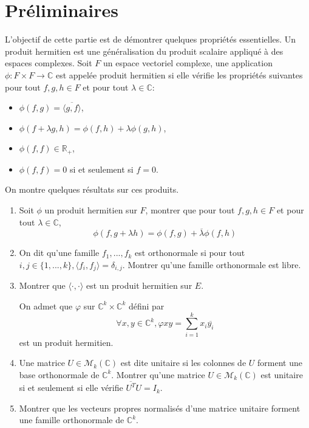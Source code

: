 \documentclass{article}[a4paper]
\newcommand{\R}{\mathbb{R}}
\newcommand{\C}{\mathbb{C}}
\newcommand{\braket}[2]{\langle #1,#2\rangle}
\begin{document}
\section{Préliminaires}
L'objectif de cette partie est de démontrer quelques propriétés essentielles.
Un produit hermitien est une généralisation du produit scalaire appliqué à des espaces 
complexes. Soit \(F\) un espace vectoriel complexe, une application 
\(\phi : F\times F \to \C\) est appelée produit hermitien si elle vérifie les propriétés suivantes 
pour tout \(f,g,h\in F\) et pour tout \(\lambda\in \C\):
\begin{itemize}
    \item \(\phi(f,g) = \overline{\braket{g}{f}}\),
    \item \(\phi(f+\lambda g,h) = \phi(f,h)+\lambda\phi(g,h)\),
    \item \(\phi(f,f) \in \R_+\),
    \item \(\phi(f,f) = 0\) si et seulement si \(f = 0\).
\end{itemize}
On montre quelques résultats sur ces produits.
\begin{enumerate}
    \item Soit \(\phi\) un produit hermitien sur \(F\), montrer que pour tout \(f,g,h\in F\) et pour tout \(\lambda\in \C\),
    \begin{equation*}
        \phi(f,g+ \lambda h) = \phi(f,g) + \overline{\lambda}\phi(f,h)
    \end{equation*}
    \item On dit qu'une famille \(f_1,...,f_k\) est orthonormale si pour tout \(i,j\in \{1,...,k\},
    \braket{f_i}{f_j} = \delta_{i,j}\). Montrer qu'une famille orthonormale est libre.
    \item Montrer que \(\braket{\cdot}{\cdot}\) est un produit hermitien sur \(E\).
    

    On admet que \(\varphi\) sur \(\C^k\times \C^k\) défini par 
    \begin{equation*}
        \forall x,y\in \C^k, \varphi{x}{y} = \sum_{i=1}^k x_i\overline{y_i}
    \end{equation*}
    est un produit hermitien.
    \item Une matrice \(U\in \mathcal{M}_k(\C)\) est dite unitaire si les colonnes de \(U\) forment 
    une base orthonormale de \(\C^k\). 
    Montrer qu'une matrice \(U\in \mathcal{M}_k(\C)\) est unitaire
    si et seulement si elle vérifie \(\overline{U^T}U = I_k\).
    \item Montrer que les vecteurs propres normalisés d'une matrice unitaire
    forment une famille orthonormale de \(\C^k\).

\end{enumerate}
\end{document}
